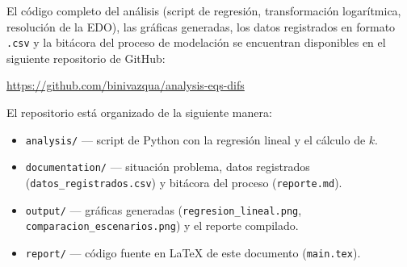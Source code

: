 \documentclass[11pt,onecolumn,letterpaper]{article}
\begin{document}
El código completo del análisis (script de regresión, transformación logarítmica, resolución de la EDO), las gráficas generadas, los datos registrados en formato \texttt{.csv} y la bitácora del proceso de modelación se encuentran disponibles en el siguiente repositorio de GitHub:

\begin{center}
    \url{https://github.com/binivazqua/analysis-eqs-difs}
\end{center}

\noindent El repositorio está organizado de la siguiente manera:

\begin{itemize}
    \item \texttt{analysis/} --- script de Python con la regresión lineal y el cálculo de \(k\).
    \item \texttt{documentation/} --- situación problema, datos registrados (\texttt{datos\_registrados.csv}) y bitácora del proceso (\texttt{reporte.md}).
    \item \texttt{output/} --- gráficas generadas (\texttt{regresion\_lineal.png}, \texttt{comparacion\_escenarios.png}) y el reporte compilado.
    \item \texttt{report/} --- código fuente en \LaTeX{} de este documento (\texttt{main.tex}).
\end{itemize}
\end{document}
